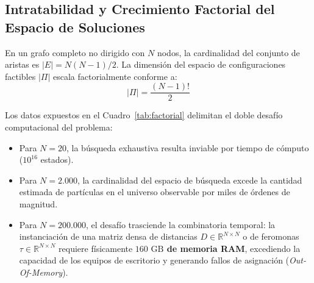 \documentclass[11pt,a4paper]{article}
\begin{document}
\subsection{Intratabilidad y Crecimiento Factorial del Espacio de Soluciones}
En un grafo completo no dirigido con $N$ nodos, la cardinalidad del conjunto de aristas es $|E| = N(N-1)/2$. La dimensión del espacio de configuraciones factibles $|\Pi|$ escala factorialmente conforme a:
\begin{equation}
    |\Pi| = \frac{(N-1)!}{2}
\end{equation}

\begin{table}[H]
\centering
\caption{Escalamiento combinatorio del espacio de soluciones y demanda teórica de almacenamiento matricial.}
\label{tab:factorial}
\end{table}

Los datos expuestos en el Cuadro~\ref{tab:factorial} delimitan el doble desafío computacional del problema:
\begin{itemize}
    \item Para $N = 20$, la búsqueda exhaustiva resulta inviable por tiempo de cómputo ($10^{16}$ estados).
    \item Para $N = 2.000$, la cardinalidad del espacio de búsqueda excede la cantidad estimada de partículas en el universo observable por miles de órdenes de magnitud.
    \item Para $N = 200.000$, el desafío trasciende la combinatoria temporal: la instanciación de una matriz densa de distancias $D \in \mathbb{R}^{N \times N}$ o de feromonas $\tau \in \mathbb{R}^{N \times N}$ requiere físicamente \textbf{$160\text{ GB}$ de memoria RAM}, excediendo la capacidad de los equipos de escritorio y generando fallos de asignación (\emph{Out-Of-Memory}).
\end{itemize}
\end{document}
